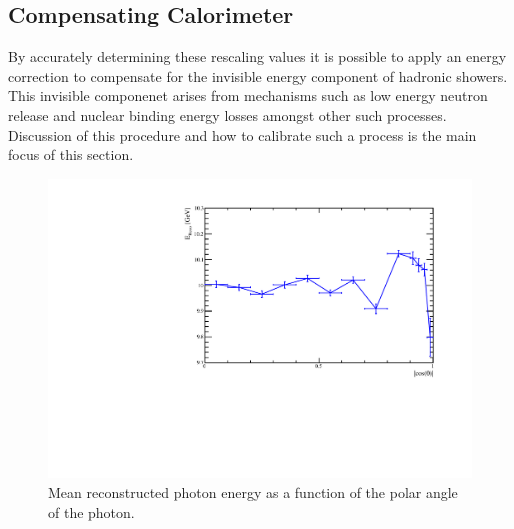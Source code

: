 \subsection{Compensating Calorimeter}

By accurately determining these rescaling values it is possible to apply an energy correction to compensate for the invisible energy component of hadronic showers.  This invisible componenet arises from mechanisms such as low energy neutron release and nuclear binding energy losses amongst other such processes.  Discussion of this procedure and how to calibrate such a process is the main focus of this section.  


\begin{figure}
  \includegraphics[width=\largefigwidth]{EnergyEstimators/Plots/Calibration/Validation/AngularDistributionPhotonPlot.pdf}
  \caption[Mean reconstructed photon energy as a function of the polar angle of the photon.]{Mean reconstructed photon energy as a function of the polar angle of the photon.}
  \label{engest:fig:photonangle}
\end{figure}

